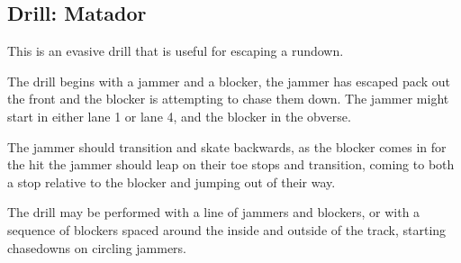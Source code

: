 \subsection*{Drill: Matador}
\label{drill:jammer_movement/jump_jukes/matator}

This is an evasive drill that is useful for escaping a rundown.


The drill begins with a jammer and a blocker, the jammer has escaped pack out the front and the blocker is attempting to chase them down.
The jammer might start in either lane 1 or lane 4, and the blocker in the obverse.


The jammer should transition and skate backwards, as the blocker comes in for the hit the jammer should leap on their toe stops and transition, coming to both a stop relative to the blocker and jumping out of their way.  


The drill may be performed with a line of jammers and blockers, or with a sequence of blockers spaced around the inside and outside of the track, starting chasedowns on circling jammers.
